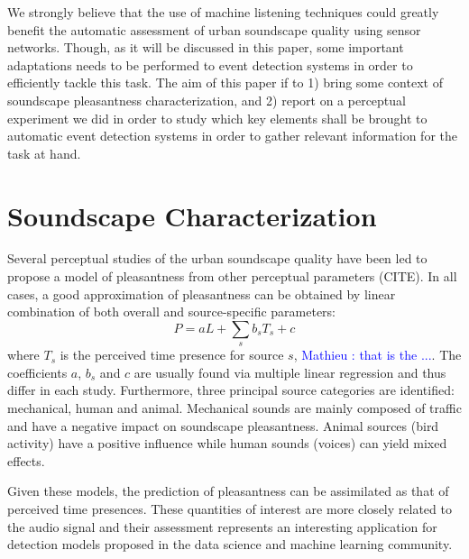 \documentclass{article}
\newcommand{\ml}[1]{\textcolor{blue}{ Mathieu : #1}}
\begin{document}
\begin{sloppy}

We strongly believe that the use of machine listening techniques could greatly benefit the automatic assessment of urban soundscape quality using sensor networks. Though, as it will be discussed in this paper, some important adaptations needs to be performed to event detection systems in order to efficiently tackle this task. The aim of this paper if to 1) bring some context of soundscape pleasantness characterization, and 2) report on a perceptual experiment we did in order to study which key elements shall be brought to automatic event detection systems in order to gather relevant information for the task at hand.

\clearpage

\section{Soundscape Characterization}
\label{sec:char}
Several perceptual studies of the urban soundscape quality have been led to propose a model of pleasantness from other perceptual parameters (CITE). In all cases, a good approximation of pleasantness can be obtained by linear combination of both overall and source-specific parameters:
\begin{equation}
P = aL + \sum_s b_sT_s + c
\end{equation}
where $T_s$ is the perceived time presence for source $s$, \ml{that is the ...}. The coefficients $a$, $b_s$ and $c$ are usually found via multiple linear regression and thus differ in each study.
Furthermore, three principal source categories are identified: mechanical, human and animal. Mechanical sounds are mainly composed of traffic and have a negative impact on soundscape pleasantness. Animal sources (bird activity) have a positive influence while human sounds (voices) can yield mixed effects.

Given these models, the prediction of pleasantness can be assimilated as that of perceived time presences. These quantities of interest are more closely related to the audio signal and their assessment represents an interesting application for detection models proposed in the data science and machine learning community.


\end{sloppy}
\end{document}
